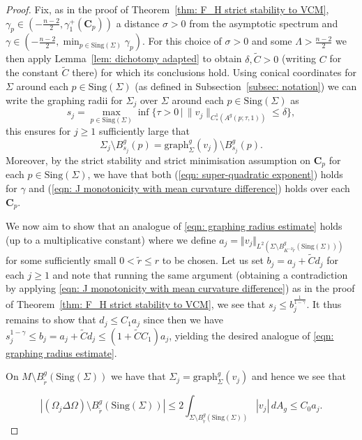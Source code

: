 \documentclass[12pt]{article}
\begin{document}
\begin{proof}
Fix, as in the proof of Theorem~\ref{thm: F_H strict stability to VCM}, $\gamma_p \in (-\frac{n-2}{2},\gamma_1^+(\mathbf{C}_p))$ a distance $\sigma > 0$ from the asymptotic spectrum and $\gamma \in (-\frac{n-2}{2},\min_{p \in \mathrm{Sing}(\Sigma)}\gamma_p)$. For this choice of $\sigma > 0$ and some $\Lambda > \frac{n-2}{2}$ we then apply Lemma~\ref{lem: dichotomy adapted} to obtain $\delta,\widetilde{C} >0$ (writing $C$ for the constant $\widetilde{C}$ there) for which its conclusions hold. Using conical coordinates for $\Sigma$ around each $p \in \mathrm{Sing}(\Sigma)$ (as defined in Subsection~\ref{subsec: notation}) we can write the graphing radii for $\Sigma_j$ over $\Sigma$ around each $p \in \mathrm{Sing}(\Sigma)$ as
    $$
         s_j =  \max_{p \in \mathrm{Sing}(\Sigma)}\inf \{ \tau>0 \, | \, \|v_j\|_{C^1_*(A^g(p;\tau,1))}\le \delta\},
    $$
this ensures for $j \geq 1$ sufficiently large that
    $$\Sigma_j \setminus B_{s_j}^g(p) = \mathrm{graph}_{\Sigma}^g(v_j) \setminus B_{s_j}^g(p).$$ 
Moreover, by the strict stability and strict minimisation assumption on $\mathbf{C}_p$ for each $p \in \mathrm{Sing}(\Sigma)$, we have that both (\ref{eqn: super-quadratic exponent}) holds for $\gamma$ and (\ref{eqn: J monotonicity with mean curvature difference}) holds over each $\mathbf{C}_p$. 

\bigskip

We now aim to show that an analogue of \eqref{eqn: graphing radius estimate} holds (up to a multiplicative constant) where we define $a_j = \Vert v_j\Vert_{L^2(\Sigma \setminus B_{K^{-2}\tilde{r}}^g(\mathrm{Sing}(\Sigma)))}$ for some sufficiently small $0 < \tilde{r} \leq r$ to be chosen. Let us set $b_j = a_j + \widetilde{C}d_j$ for each $j \geq 1$ and note that running the same argument (obtaining a contradiction by applying \eqref{eqn: J monotonicity with mean curvature difference}) as in the proof of Theorem~\ref{thm: F_H strict stability to VCM}, we see that $s_j \leq b_j^{\frac{1}{1-\gamma}}$. It thus remains to show that $d_j \leq C_1 a_j$ since then we have  $s_j^{1-\gamma} \leq b_j = a_j + \widetilde{C}d_j \leq (1 + \widetilde{C}C_1)a_j$,
yielding the desired analogue of \eqref{eqn: graphing radius estimate}.

\bigskip

On $M \setminus B_{\tilde{r}}^g(\mathrm{Sing}(\Sigma))$ we have that $\Sigma_j = \mathrm{graph}_\Sigma^g(v_j)$ and hence we see that 

\begin{equation}\label{eq:bound1}
|(\Omega_j \Delta \Omega) \setminus  B_{\tilde{r}}^g(\mathrm{Sing}(\Sigma))| \leq 2\int_{\Sigma \setminus B_{\tilde{r}}^g(\mathrm{Sing}(\Sigma))} |v_j| \, dA_g \leq C_0 a_j.    
\end{equation}


\end{proof}
\end{document}
